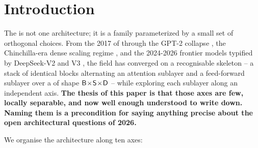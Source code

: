 
\section{Introduction}
\label{sec:introduction}

The  is not one architecture; it is a family parameterized
by a small set of orthogonal choices. From the 2017 
of \citet{vaswani2017} through the GPT-2  collapse
\citep{radford2019-gpt2}, the Chinchilla-era dense scaling regime
\citep{hoffmann2022-chinchilla}, and the 2024-2026 frontier models
typified by DeepSeek-V2 and V3 \citep{deepseek-v2,deepseek-v3}, the
field has converged on a recognisable skeleton -- a stack of
identical blocks alternating an attention sublayer and a feed-forward
sublayer over a  of shape $\mathsf{B}\!\times\!\mathsf{S}\!\times\!\mathsf{D}$ -- while exploring
each sublayer along an independent axis. \textbf{The thesis of this
paper is that those axes are few, locally separable, and now well
enough understood to write down. Naming them is a precondition for
saying anything precise about the open architectural questions of
2026.}

We organise the architecture along ten axes:


